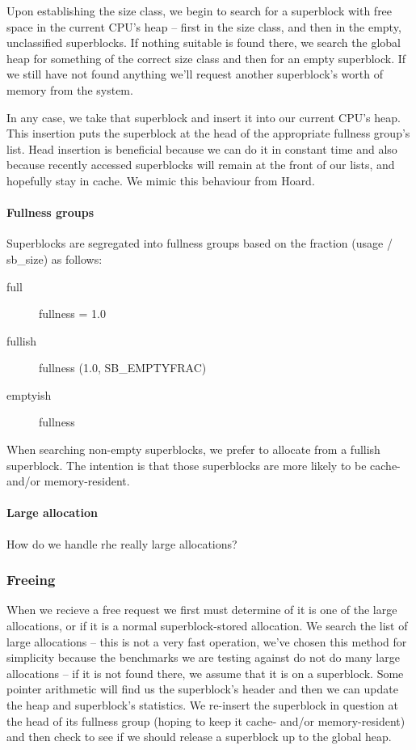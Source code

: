 \documentclass{article}
\begin{document}
Upon establishing the size class, we begin to search for a superblock with
free space in the current CPU's heap -- first in the size class, and then in the
empty, unclassified superblocks. If nothing suitable is found there, we search
the global heap for something of the correct size class and then for an empty
superblock. If we still have not found anything we'll request another
superblock's worth of memory from the system.

In any case, we take that superblock and insert it into our current CPU's heap.
This insertion puts the superblock at the head of the appropriate fullness
group's list. Head insertion is beneficial because we can do it in constant
time and also because recently accessed superblocks will remain at the front
of our lists, and hopefully stay in cache. We mimic this behaviour from Hoard.

\paragraph{Fullness groups}
Superblocks are segregated into fullness groups based on the fraction
(usage / sb\_size) as follows:
\begin{description}
    \item[full] fullness = 1.0
    \item[fullish] fullness \in (1.0, SB\_EMPTYFRAC)
    \item[emptyish] fullness \in [SB\_EMPTYFRAC, 0]
\end{description}

When searching non-empty superblocks, we prefer to allocate from a fullish
superblock. The intention is that those superblocks are more likely to be 
cache- and/or memory-resident.

\paragraph{Large allocation}
How do we handle rhe really large allocations?

\subsubsection{Freeing}
When we recieve a free request we first must determine of it is one of the
large allocations, or if it is a normal superblock-stored allocation. We
search the list of large allocations -- this is not a very fast operation,
we've chosen this method for simplicity because the benchmarks we are testing
against do not do many large allocations -- if it is not found there, we
assume that it is on a superblock. Some pointer arithmetic will find us the 
superblock's header and then we can update the heap and superblock's
statistics. We re-insert the superblock in question at the head of its
fullness group (hoping to keep it cache- and/or memory-resident) and then
check to see if we should release a superblock up to the global heap.
\end{document}
